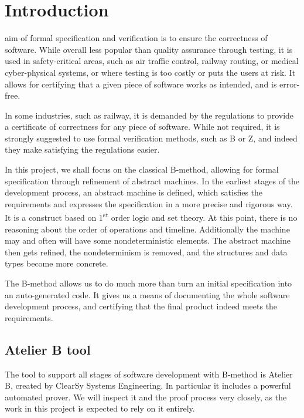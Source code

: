 \documentclass[11pt,journal]{IEEEtran}
\begin{document}
	
	\IEEEpeerreviewmaketitle
	
	
	
	\section{Introduction}
	 aim of formal specification and verification is to ensure the correctness of software. While overall less popular than quality assurance through testing, it is used in safety-critical areas, such as air traffic control, railway routing, or medical cyber-physical systems, or where testing is too costly or puts the users at risk. It allows for certifying that a given piece of software works as intended, and is error-free.
	
	In some industries, such as railway, it is demanded by the regulations to provide a certificate of correctness for any piece of software. While not required, it is strongly suggested to use formal verification methods, such as B or Z, and indeed they make satisfying the regulations easier.\cite{railway standard}
	
	In this project, we shall focus on the classical B-method, allowing for formal specification through refinement of abstract machines. In the earliest stages of the development process, an abstract machine is defined, which satisfies the requirements and expresses the specification in a more precise and rigorous way. It is a construct based on 1\textsuperscript{st} order logic and set theory. At this point, there is no reasoning about the order of operations and timeline. Additionally the machine may and often will have some nondeterministic elements. The abstract machine then gets refined, the nondeterminism is removed, and the structures and data types become more concrete.
	
	The B-method allows us to do much more than turn an initial specification into an auto-generated code. It gives us a means of documenting the whole software development process, and certifying that the final product indeed meets the requirements.
	
	\subsection{Atelier B tool}
	The tool to support all stages of software development with B-method is Atelier B, created by ClearSy Systems Engineering. In particular it includes a powerful automated prover. We will inspect it and the proof process very closely, as the work in this project is expected to rely on it entirely.
	
\end{document}
